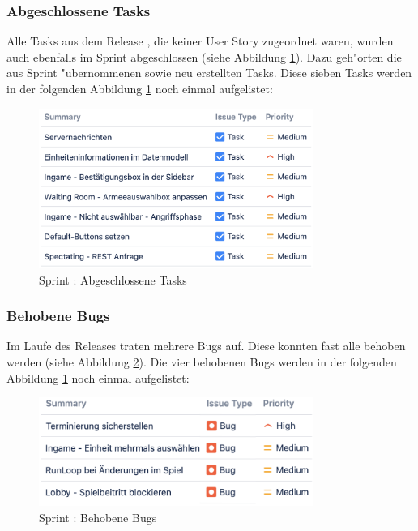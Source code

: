 \documentclass[12pt, titlepage]{scrartcl}
\newcommand{\RN}[1]{%
	\textup{\uppercase\expandafter{\romannumeral#1}}%
}
\begin{document}
    		\subsubsection{Abgeschlossene Tasks}
    			Alle Tasks aus dem Release \RN{3}, die keiner User Story zugeordnet waren, wurden auch ebenfalls im Sprint \RN{6} abgeschlossen (siehe Abbildung \ref{Done_Tasks_6}). Dazu geh"orten die aus Sprint \RN{5} "ubernommenen sowie neu erstellten Tasks. Diese sieben Tasks werden in der folgenden Abbildung \ref{Done_Tasks_6} noch einmal aufgelistet:
    			\begin{figure}[H]
    				\centering
    				\includegraphics[width=0.8\textwidth]{images/sprintVI/doneTasks.png}
    				\caption{Sprint \RN{6}: Abgeschlossene Tasks}
    				\label{Done_Tasks_6}
    			\end{figure}
    		\subsubsection{Behobene Bugs}
    			Im Laufe des Releases traten mehrere Bugs auf. Diese konnten fast alle behoben werden (siehe Abbildung \ref{Fixed_Bugs_6}). Die vier behobenen Bugs werden in der folgenden Abbildung \ref{Done_Tasks_6} noch einmal aufgelistet:
    			\begin{figure}[H]
    				\centering
    				\includegraphics[width=0.8\textwidth]{images/sprintVI/fixedBugs.png}
    				\caption{Sprint \RN{6}: Behobene Bugs}
    				\label{Fixed_Bugs_6}
    			\end{figure}
\end{document}
